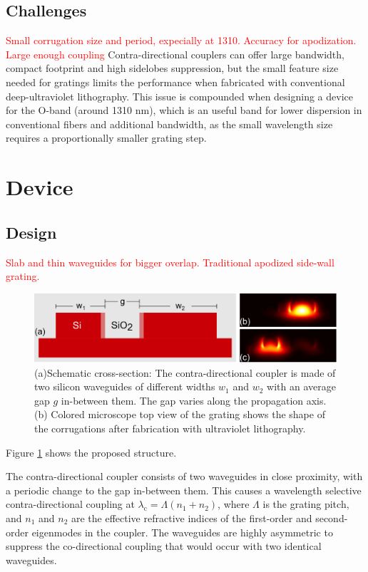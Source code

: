 \documentclass[letterpaper,10pt]{article}
\newcommand\todo[1]{\textcolor{red}{#1}}
\begin{document}
\subsection{Challenges}
\todo{Small corrugation size and period, expecially at 1310. Accuracy for apodization. Large enough coupling}
Contra-directional couplers can offer large bandwidth, compact footprint and high sidelobes suppression, but the small feature size needed for gratings limits the performance when fabricated with conventional deep-ultraviolet lithography\cite{shi2013ultra}\cite{shi2013coupler}. This issue is compounded when designing a device for the O-band (around 1310 nm), which is an useful band for lower dispersion in conventional fibers and additional bandwidth, as the small wavelength size requires a proportionally smaller grating step.



\section{Device}
\subsection{Design} 
\todo{Slab and thin waveguides for bigger overlap. Traditional apodized side-wall grating.}
\begin{figure}[htbp]
	\centering
	\includegraphics[width=.99\columnwidth]{CrossSection2}
	\caption{ (a)Schematic cross-section: The contra-directional coupler is made of two silicon waveguides of different widths $w_1$ and $w_2$ with an average gap $g$ in-between them. The gap varies along the propagation axis. (b) Colored microscope top view of the grating shows the shape of the corrugations after fabrication with ultraviolet lithography. }
	\label{fig:Device}
\end{figure}
Figure \ref{fig:Device} shows the proposed structure.

The contra-directional coupler consists of two waveguides in close proximity, with a periodic change to the gap in-between them. This causes a wavelength selective contra-directional coupling at  $\lambda_\text{c} = \Lambda (n_\text{1}+n_\text{2})$, where $\Lambda$ is the grating pitch, and $n_\text{1}$ and $n_\text{2}$ are the effective refractive indices of the first-order and second-order eigenmodes in the coupler. 
The waveguides are highly asymmetric to suppress the co-directional coupling that would occur with two identical waveguides.
\end{document}
